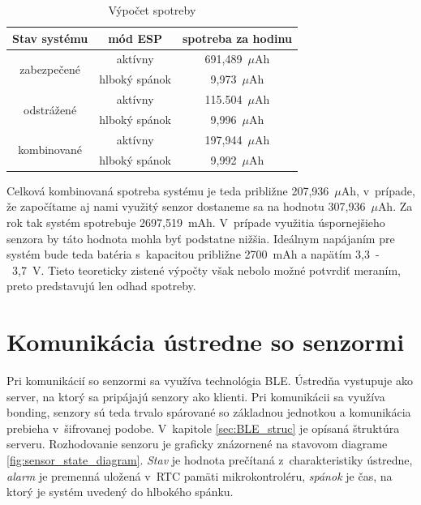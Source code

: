 \begin{table}[ht]
    \centering
    \renewcommand{\arraystretch}{1.5}
    \begin{tabular}{|c|c|c|} \hline
        Stav systému                    & mód ESP          & spotreba za hodinu \\ \hline
        \multirow{2}{*}{zabezpečené}    & aktívny          & 691,489~$\mu$Ah \\ \cline{2-3}
                                        & hlboký spánok    & 9,973~$\mu$Ah \\ \hline
        \multirow{2}{*}{odstrážené}     & aktívny          & 115.504~$\mu$Ah \\ \cline{2-3}
                                        & hlboký spánok    & 9,996~$\mu$Ah \\ \hline
        \multirow{2}{*}{kombinované}    & aktívny          & 197,944~$\mu$Ah \\ \cline{2-3}
                                        & hlboký spánok    & 9,992~$\mu$Ah \\ \hline
    \end{tabular}
    \caption{Výpočet spotreby}
    \label{tab:spotreba_jednotky}
\end{table}

Celková kombinovaná spotreba systému je teda približne 207,936~$\mu$Ah, v~prípade, že započítame aj nami využitý senzor dostaneme sa na hodnotu 307,936~$\mu$Ah. Za rok tak systém spotrebuje 2697,519~mAh. V~prípade využitia úspornejšieho senzora by táto hodnota mohla byť podstatne nižšia. Ideálnym napájaním pre systém bude teda batéria s~kapacitou približne 2700~mAh a napätím 3,3~-~3,7~V. Tieto teoreticky zistené výpočty však nebolo možné potvrdiť meraním, preto predstavujú len odhad spotreby.

\section{Komunikácia ústredne so senzormi}\label{sec:komunikacia}

Pri komunikácií so senzormi sa využíva technológia BLE. Ústredňa vystupuje ako server, na ktorý sa pripájajú senzory ako klienti. Pri komunikácii sa využíva bonding, senzory sú teda trvalo spárované so základnou jednotkou a komunikácia prebieha v~šifrovanej podobe. V~kapitole \ref{sec:BLE_struc} je opísaná štruktúra serveru. Rozhodovanie senzoru je graficky znázornené na stavovom diagrame \ref{fig:sensor_state_diagram}. \textit{Stav} je hodnota prečítaná z~charakteristiky ústredne, \textit{alarm} je premenná uložená v~RTC pamäti mikrokontroléru, \textit{spánok} je čas, na ktorý je systém uvedený do hlbokého spánku.

